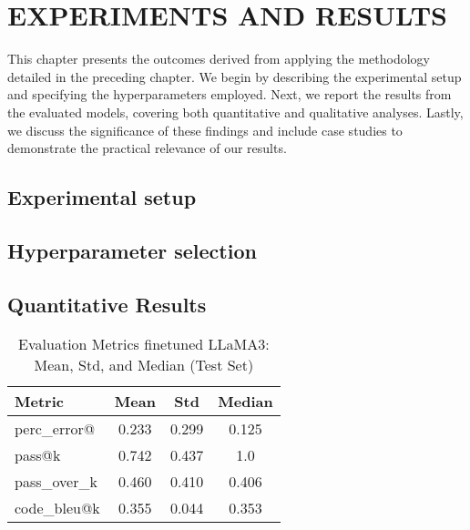 \chapter{ EXPERIMENTS AND RESULTS}

This chapter presents the outcomes derived from applying the methodology detailed in the preceding chapter. We begin by describing the experimental setup and specifying the hyperparameters employed. Next, we report the results from the evaluated models, covering both quantitative and qualitative analyses. Lastly, we discuss the significance of these findings and include case studies to demonstrate the practical relevance of our results.

\section{Experimental setup}

\section{Hyperparameter selection}

\section{Quantitative Results}


\begin{table}[h!]
\centering
\caption{Evaluation Metrics finetuned LLaMA3: Mean, Std, and Median (Test Set)}
{%
\begin{tabular}{l|ccc}
\toprule
\textbf{Metric} & \textbf{Mean} & \textbf{Std} & \textbf{Median} \\
\midrule
perc\_error@ & 0.233 & 0.299 & 0.125 \\
pass@k    & 0.742 & 0.437 & 1.0   \\
pass\_over\_k  & 0.460 & 0.410 & 0.406 \\
code\_bleu@k  & 0.355 & 0.044 & 0.353 \\
\bottomrule
\end{tabular}
}
\label{tab:metrics_generated}
\end{table}


